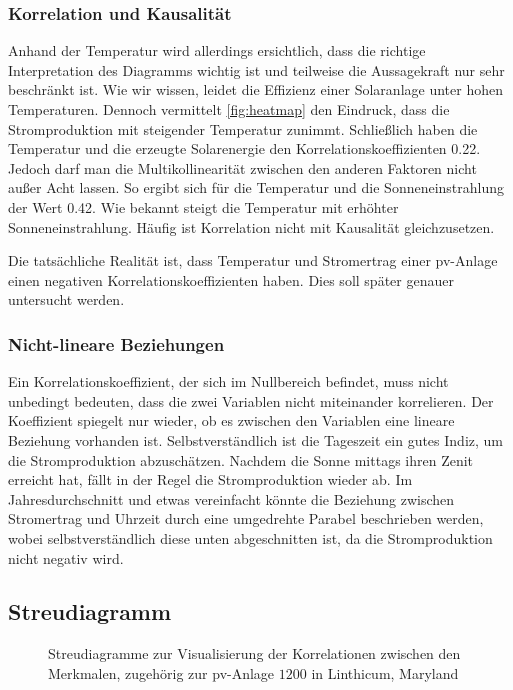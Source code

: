\documentclass[12pt, a4paper]{article}
\begin{document}
\subsubsection{Korrelation und Kausalität}

Anhand der Temperatur wird allerdings ersichtlich, dass die richtige Interpretation des Diagramms wichtig ist und teilweise die Aussagekraft nur sehr beschränkt ist. Wie wir wissen, leidet die Effizienz einer Solaranlage unter hohen Temperaturen. Dennoch vermittelt \autoref{fig:heatmap} den Eindruck, dass die Stromproduktion mit steigender Temperatur zunimmt. Schließlich haben die Temperatur und die erzeugte Solarenergie den Korrelationskoeffizienten 0.22. Jedoch darf man die Multikollinearität zwischen den anderen Faktoren nicht außer Acht lassen. So ergibt sich für die Temperatur und die Sonneneinstrahlung der Wert 0.42. Wie bekannt steigt die Temperatur mit erhöhter Sonneneinstrahlung. Häufig ist Korrelation nicht mit Kausalität gleichzusetzen.

Die tatsächliche Realität ist, dass Temperatur und Stromertrag einer \ac{pv}-Anlage einen negativen Korrelationskoeffizienten haben. Dies soll später genauer untersucht werden.

\subsubsection{Nicht-lineare Beziehungen}

Ein Korrelationskoeffizient, der sich im Nullbereich befindet, muss nicht unbedingt bedeuten, dass die zwei Variablen nicht miteinander korrelieren. Der Koeffizient spiegelt nur wieder, ob es zwischen den Variablen eine lineare Beziehung vorhanden ist. Selbstverständlich ist die Tageszeit ein gutes Indiz, um die Stromproduktion abzuschätzen. Nachdem die Sonne mittags ihren Zenit erreicht hat, fällt in der Regel die Stromproduktion wieder ab. Im Jahresdurchschnitt und etwas vereinfacht könnte die Beziehung zwischen Stromertrag und Uhrzeit durch eine umgedrehte Parabel beschrieben werden, wobei selbstverständlich diese unten abgeschnitten ist, da die Stromproduktion nicht negativ wird.


\subsection{Streudiagramm}

\begin{figure}
\centering
\def\svgwidth{450pt}

\caption{Streudiagramme zur Visualisierung der Korrelationen zwischen den Merkmalen, zugehörig zur \ac{pv}-Anlage $1200$ in Linthicum, Maryland}
\label{fig:pairplot_all}
\end {figure}
\end{document}
